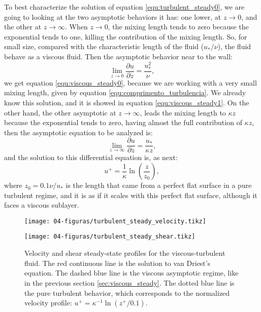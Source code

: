 \begin{apendicesenv}
    To best characterize the solution of equation \ref{equ:turbulent_steady0}, we are going to looking at the two asymptotic behaviors it has: one lower, at $z\to 0$, and the other at $z\to\infty$. When $z\to 0$, the mixing length tends to zero because the exponential tends to one, killing the contribution of the mixing length. So, for small size, compared with the characteristic length of the fluid ($u_*/\nu$), the fluid behave as a viscous fluid. Then the asymptotic behavior near to the wall:
    \begin{equation}
        \lim_{z \to 0} \frac{\partial u}{\partial z} = \frac{u_*^2}{\nu},
    \end{equation}
we get equation \ref{equ:viscous_steady0}, because we are working with a very small mixing length, given by equation \ref{equ:comprimento_turbulencia}. We already know this solution, and it is showed in equation \ref{equ:viscous_steady1}. On the other hand, the other asymptotic at $z\to\infty$, leads the mixing length to $\kappa z$ because the exponential tends to zero, having almost the full contribution of $\kappa z$, then the asymptotic equation to be analyzed is:
    \begin{equation}
        \lim_{z \to \infty} \frac{\partial u}{\partial z} = \frac{u_*}{\kappa z},
    \end{equation}
and the solution to this differential equation is, as next:
    \begin{equation}
        u^+ = \frac{1}{\kappa}\ln\left(\frac{z}{z_0}\right),
    \end{equation}
where $z_0=0.1\nu/u_*$ is the length that came from a perfect flat surface in a pure turbulent regime, and it is as if it scales with this perfect flat surface, although it faces a viscous sublayer.

    \begin{figure}[H]
        \centering
        \parbox{0.495\textwidth}{
            \centering
            \texttt{[image: 04-figuras/turbulent\_steady\_velocity.tikz]}
            \label{fig:turbulent_steady_velocity}
        }
        \parbox{0.495\textwidth}{
            \centering
            \texttt{[image: 04-figuras/turbulent\_steady\_shear.tikz]}
            \label{fig:turbulent_steady_shear}
        }
        \caption[Steady-state numerical solution for viscous-turbulent fluid profiles.]{Velocity and shear steady-state profiles for the viscous-turbulent fluid. The red continuous line is the solution to van Driest's equation. The dashed blue line is the viscous asymptotic regime, like in the previous section \ref{sec:viscous_steady}. The dotted blue line is the pure turbulent behavior, which corresponds to the normalized velocity profile: $u^+=\kappa^{-1}\ln(z^+/0.1)$.}
        \label{fig:turbulent_steady}
    \end{figure}


\end{apendicesenv}
